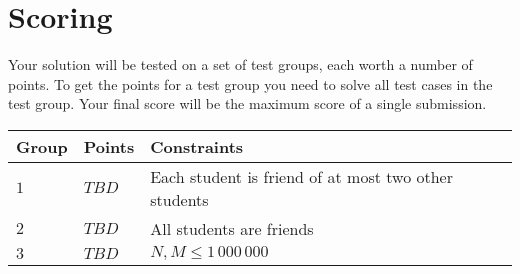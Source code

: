 \section*{Scoring}
Your solution will be tested on a set of test groups, each worth a number of points.
To get the points for a test group you need to solve all test cases in the test group.
Your final score will be the maximum score of a single submission.

\noindent
\begin{tabular}{| l | l | l | l |}
\hline
Group & Points & Constraints \\ \hline
$1$    & $TBD$         & Each student is friend of at most two other students \\ \hline
$2$    & $TBD$         & All students are friends \\ \hline
$3$    & $TBD$         & $N, M \le 1\,000\,000$ \\ \hline
\end{tabular}
